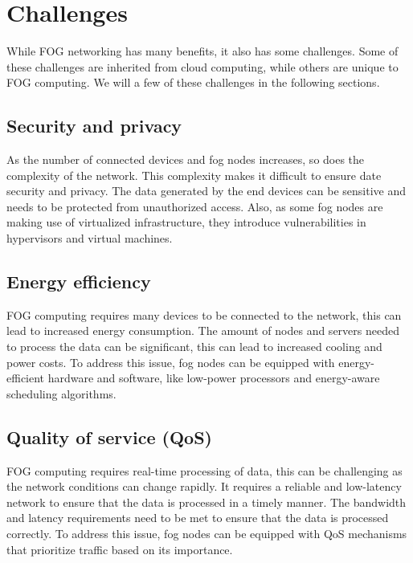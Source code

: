 \section{Challenges}
\label{sec:fog-challenges}

While FOG networking has many benefits, it also has some challenges. Some of these challenges are inherited from cloud
computing, while others are unique to FOG computing. We will a few of these challenges in the following sections.

\subsection{Security and privacy}
\label{subsec:fog-security}

As the number of connected devices and fog nodes increases, so does the complexity of the network. This complexity makes
it difficult to ensure date security and privacy. The data generated by the end devices can be sensitive and needs to be
protected from unauthorized access. Also, as some fog nodes are making use of virtualized infrastructure, they
introduce vulnerabilities in hypervisors and virtual machines.

\subsection{Energy efficiency}
\label{subsec:fog-energy}

FOG computing requires many devices to be connected to the network, this can lead to increased energy consumption. The
amount of nodes and servers needed to process the data can be significant, this can lead to increased cooling and power
costs. To address this issue, fog nodes can be equipped with energy-efficient hardware and software, like low-power
processors and energy-aware scheduling algorithms.

\subsection{Quality of service (QoS)}

FOG computing requires real-time processing of data, this can be challenging as the network conditions can change rapidly.
It requires a reliable and low-latency network to ensure that the data is processed in a timely manner. The bandwidth
and latency requirements need to be met to ensure that the data is processed correctly. To address this issue, fog nodes
can be equipped with QoS mechanisms that prioritize traffic based on its importance.

